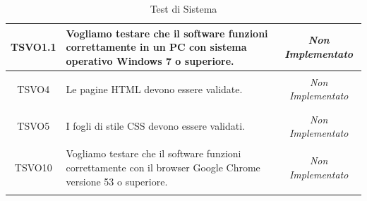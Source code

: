 \begin{longtable}{|c|>{}m{8cm}|c|}
\hypertarget{TSVO1.1}{TSVO1.1} & Vogliamo testare che il software funzioni correttamente in un PC con sistema operativo Windows 7 o superiore.
 & \textit{Non Implementato}\\ \hline
\hypertarget{TSVO4}{TSVO4} & Le pagine HTML devono essere validate. & \textit{Non Implementato}\\ \hline
\hypertarget{TSVO5}{TSVO5} & I fogli di stile CSS devono essere validati. & \textit{Non Implementato}\\ \hline
\hypertarget{TSVO10}{TSVO10} & Vogliamo testare che il software funzioni correttamente con il browser Google Chrome versione 53 o superiore. & \textit{Non Implementato}\\ \hline
\caption[Test di Sistema]{Test di Sistema}
\label{tabella:test1}
\end{longtable}
\clearpage

